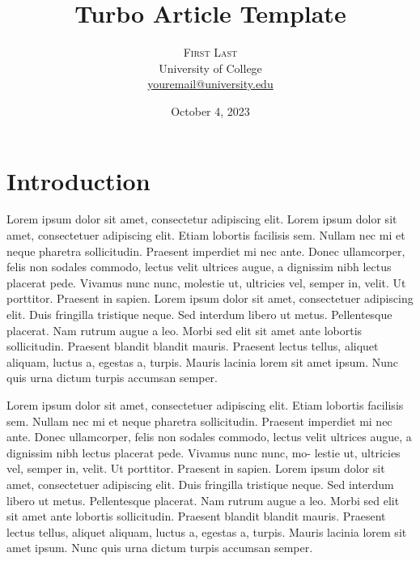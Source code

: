 \documentclass[
  9pt,
  twocolumn,
  twoside]{turbo}%
\title{Turbo Article Template}
\author{
\textsc{First Last}
\\[1ex]
\normalsize University of College
\\
\normalsize\href{mailto:youremail@university.edu}{youremail@university.edu}
}
\date{October 4, 2023}
\begin{document}
\renewcommand{\maketitlehookd}{%
\begin{abstract}
\noindent{}Lorem ipsum dolor sit amet, consectetuer adipiscing elit.
Etiam lobortis facilisis sem. Nullam nec mi et neque pharetra
sollicitudin. Praesent imperdiet mi nec ante. Donec ullamcorper, felis
non sodales com- modo, lectus velit ultrices augue, a dignissim nibh
lectus placerat pede. Vivamus nunc nunc, molestie ut, ultricies vel,
semper in, velit. Ut porttitor. Praesent in sapien. Lorem ipsum dolor
sit amet, consectetuer adipiscing elit. This is the abstract.
\end{abstract}
}

\maketitle

\ifdefined\Shaded\renewenvironment{Shaded}{\begin{tcolorbox}[boxrule=0pt, frame hidden, interior hidden, borderline west={3pt}{0pt}{shadecolor}, enhanced, breakable, sharp corners]}{\end{tcolorbox}}\fi




\hypertarget{sec-intro}{%
\section{Introduction}\label{sec-intro}}

Lorem ipsum dolor sit amet, consectetur adipiscing elit. Lorem ipsum
dolor sit amet, consectetuer adipiscing elit. Etiam lobortis facilisis
sem. Nullam nec mi et neque pharetra sollicitudin. Praesent imperdiet mi
nec ante. Donec ullamcorper, felis non sodales commodo, lectus velit
ultrices augue, a dignissim nibh lectus placerat pede. Vivamus nunc
nunc, molestie ut, ultricies vel, semper in, velit. Ut porttitor.
Praesent in sapien. Lorem ipsum dolor sit amet, consectetuer adipiscing
elit. Duis fringilla tristique neque. Sed interdum libero ut metus.
Pellentesque placerat. Nam rutrum augue a leo. Morbi sed elit sit amet
ante lobortis sollicitudin. Praesent blandit blandit mauris. Praesent
lectus tellus, aliquet aliquam, luctus a, egestas a, turpis. Mauris
lacinia lorem sit amet ipsum. Nunc quis urna dictum turpis accumsan
semper.

Lorem ipsum dolor sit amet, consectetuer adipiscing elit. Etiam lobortis
facilisis sem. Nullam nec mi et neque pharetra sollicitudin. Praesent
imperdiet mi nec ante. Donec ullamcorper, felis non sodales commodo,
lectus velit ultrices augue, a dignissim nibh lectus placerat pede.
Vivamus nunc nunc, mo- lestie ut, ultricies vel, semper in, velit. Ut
porttitor. Praesent in sapien. Lorem ipsum dolor sit amet, consectetuer
adipiscing elit. Duis fringilla tristique neque. Sed interdum libero ut
metus. Pellentesque placerat. Nam rutrum augue a leo. Morbi sed elit sit
amet ante lobortis sollicitudin. Praesent blandit blandit mauris.
Praesent lectus tellus, aliquet aliquam, luctus a, egestas a, turpis.
Mauris lacinia lorem sit amet ipsum. Nunc quis urna dictum turpis
accumsan semper.
\end{document}
